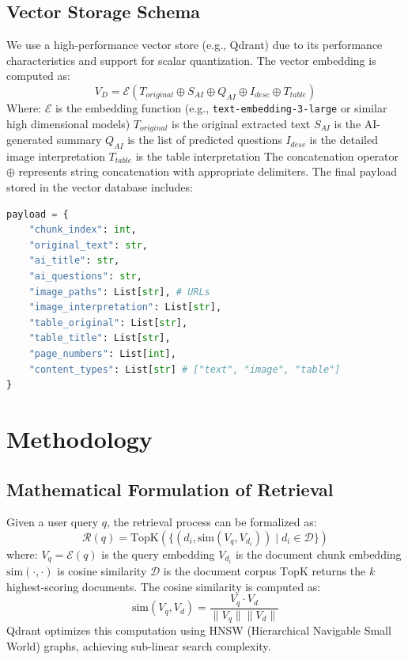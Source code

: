 \documentclass[conference]{IEEEtran}
\begin{document}
\subsection{Vector Storage Schema}
We use a high-performance vector store (e.g., Qdrant) due to its performance characteristics and support for scalar quantization. The vector embedding is computed as:
\begin{equation}
V_D = \mathcal{E}\left( T_{original} \oplus S_{AI} \oplus Q_{AI} \oplus I_{desc} \oplus T_{table} \right)
\end{equation}
Where: $\mathcal{E}$ is the embedding function (e.g., \texttt{text-embedding-3-large} or similar high dimensional models)
$T_{original}$ is the original extracted text
$S_{AI}$ is the AI-generated summary
$Q_{AI}$ is the list of predicted questions
$I_{desc}$ is the detailed image interpretation
$T_{table}$ is the table interpretation
The concatenation operator $\oplus$ represents string concatenation with appropriate delimiters. The final payload stored in the vector database includes:
\begin{lstlisting}[language=Python, caption=Vector Payload Structure, numbers=none]
payload = {
    "chunk_index": int,
    "original_text": str,
    "ai_title": str,
    "ai_questions": str,
    "image_paths": List[str], # URLs
    "image_interpretation": List[str],
    "table_original": List[str],
    "table_title": List[str],
    "page_numbers": List[int],
    "content_types": List[str] # ["text", "image", "table"]
}
\end{lstlisting}
\section{Methodology}
\subsection{Mathematical Formulation of Retrieval}
Given a user query $q$, the retrieval process can be formalized as:
\begin{equation}
\mathcal{R}(q) = \text{TopK}\left( \{ (d_i, \text{sim}(V_q, V_{d_i})) \mid d_i \in \mathcal{D} \} \right)
\end{equation}
where:
$V_q = \mathcal{E}(q)$ is the query embedding
$V_{d_i}$ is the document chunk embedding
$\text{sim}(\cdot, \cdot)$ is cosine similarity
$\mathcal{D}$ is the document corpus
$\text{TopK}$ returns the $k$ highest-scoring documents. The cosine similarity is computed as:
\begin{equation}
\text{sim}(V_q, V_d) = \frac{V_q \cdot V_d}{\|V_q\| \|V_d\|}
\end{equation}
Qdrant optimizes this computation using HNSW (Hierarchical Navigable Small World) graphs, achieving sub-linear search complexity.
\end{document}
